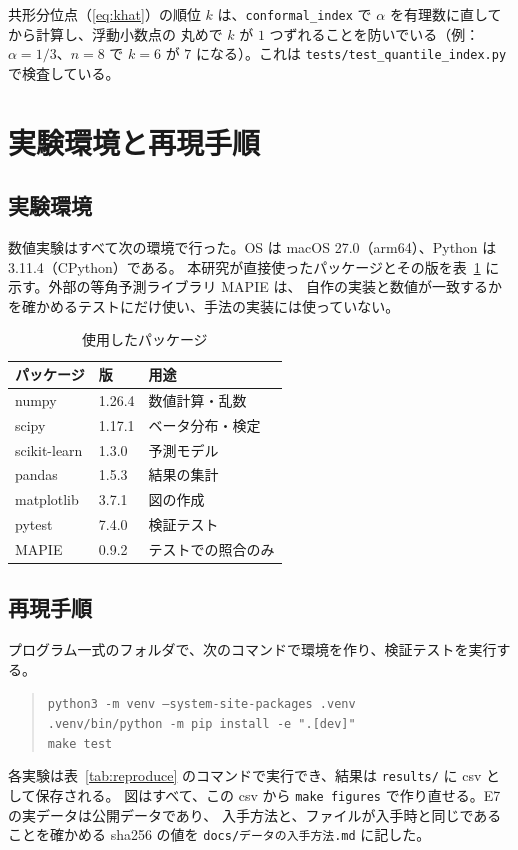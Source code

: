 \documentclass[a4paper,11pt]{jsarticle}
\theoremstyle{definition}
\theoremstyle{plain}
\theoremstyle{remark}
\begin{document}
共形分位点（\eqref{eq:khat}）の順位 $k$ は、\texttt{conformal\_index} で $\alpha$ を有理数に直してから計算し、浮動小数点の
丸めで $k$ が $1$ つずれることを防いでいる（例：$\alpha=1/3$、$n=8$ で $k=6$ が $7$ になる）。これは \texttt{tests/test\_quantile\_index.py} で検査している。

\section{実験環境と再現手順}
\label{app:reproduce}

\subsection{実験環境}

数値実験はすべて次の環境で行った。OS は macOS 27.0（arm64）、Python は 3.11.4（CPython）である。
本研究が直接使ったパッケージとその版を表~\ref{tab:env} に示す。外部の等角予測ライブラリ MAPIE は、
自作の実装と数値が一致するかを確かめるテストにだけ使い、手法の実装には使っていない。

\begin{table}[htbp]
  \centering
  \caption{使用したパッケージ}
  \label{tab:env}
  \begin{tabular}{lll}
    \toprule
    パッケージ & 版 & 用途 \\
    \midrule
    numpy & 1.26.4 & 数値計算・乱数 \\
    scipy & 1.17.1 & ベータ分布・検定 \\
    scikit-learn & 1.3.0 & 予測モデル \\
    pandas & 1.5.3 & 結果の集計 \\
    matplotlib & 3.7.1 & 図の作成 \\
    pytest & 7.4.0 & 検証テスト \\
    MAPIE & 0.9.2 & テストでの照合のみ \\
    \bottomrule
  \end{tabular}
\end{table}

\subsection{再現手順}

プログラム一式のフォルダで、次のコマンドで環境を作り、検証テストを実行する。
\begin{quote}
  \texttt{python3 -m venv --system-site-packages .venv}\\
  \texttt{.venv/bin/python -m pip install -e ".[dev]"}\\
  \texttt{make test}
\end{quote}
各実験は表~\ref{tab:reproduce} のコマンドで実行でき、結果は \texttt{results/} に csv として保存される。
図はすべて、この csv から \texttt{make figures} で作り直せる。E7 の実データは公開データであり、
入手方法と、ファイルが入手時と同じであることを確かめる sha256 の値を
\texttt{docs/データの入手方法.md} に記した。
\end{document}
